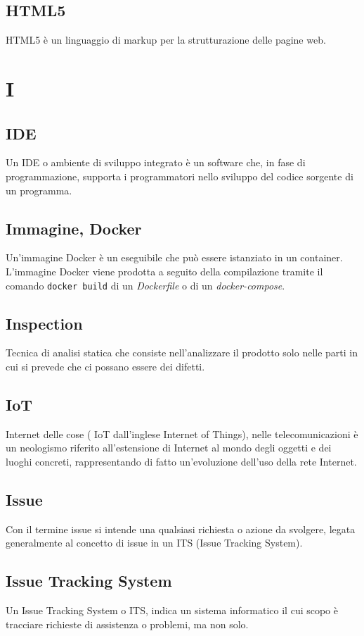 \subsection{HTML5}  HTML5 è un linguaggio di markup per la strutturazione delle pagine web.

\newpage \section{I}
\subsection{IDE}   Un IDE o ambiente di sviluppo integrato è un software che, in fase di programmazione, supporta i programmatori nello sviluppo del codice sorgente di un programma.
\subsection{Immagine, Docker} Un'immagine Docker è un eseguibile che può essere istanziato in un container. L'immagine Docker viene prodotta a seguito della compilazione tramite il comando \verb!docker build! di un \textit{Dockerfile} o di un \textit{docker-compose}.
\subsection{Inspection}  Tecnica di analisi statica che consiste nell'analizzare il prodotto solo nelle parti in cui si prevede che ci possano essere dei difetti.
\subsection{IoT }  Internet delle cose ( IoT dall'inglese Internet of Things), nelle telecomunicazioni è un neologismo riferito all'estensione di Internet al mondo degli oggetti e dei luoghi concreti, rappresentando di fatto un'evoluzione dell'uso della rete Internet.
\subsection{Issue}  Con il termine issue si intende una qualsiasi richiesta o azione da svolgere, legata generalmente al concetto di issue in un ITS (Issue Tracking System).
\subsection{Issue Tracking System}  Un Issue Tracking System o ITS, indica un sistema informatico il cui scopo è tracciare richieste di assistenza o problemi, ma non solo.


